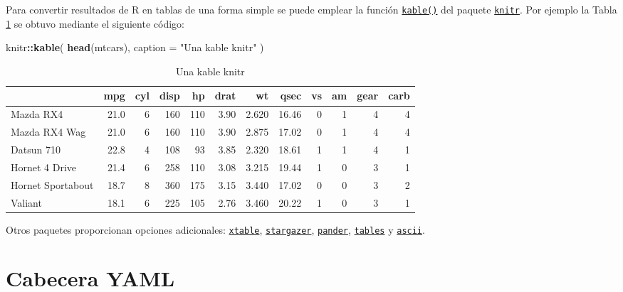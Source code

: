 \documentclass[
]{book}
\newenvironment{Shaded}{\begin{snugshade}}{\end{snugshade}}
\newcommand{\AttributeTok}[1]{\textcolor[rgb]{0.13,0.29,0.53}{#1}}
\newcommand{\FunctionTok}[1]{\textcolor[rgb]{0.13,0.29,0.53}{\textbf{#1}}}
\newcommand{\NormalTok}[1]{#1}
\newcommand{\SpecialCharTok}[1]{\textcolor[rgb]{0.81,0.36,0.00}{\textbf{#1}}}
\newcommand{\StringTok}[1]{\textcolor[rgb]{0.31,0.60,0.02}{#1}}
\theoremstyle{break}
\theoremstyle{nonumberplain}
\begin{document}
Para convertir resultados de R en tablas de una forma simple se puede emplear la función \href{https://rdrr.io/pkg/knitr/man/kable.html}{\texttt{kable()}} del paquete \href{https://yihui.org/knitr/}{\texttt{knitr}}. Por ejemplo la Tabla \ref{tab:kable} se obtuvo mediante el siguiente código:

\begin{Shaded}
\begin{Highlighting}[]
\NormalTok{knitr}\SpecialCharTok{::}\FunctionTok{kable}\NormalTok{(}
  \FunctionTok{head}\NormalTok{(mtcars), }
  \AttributeTok{caption =} \StringTok{"Una kable knitr"}
\NormalTok{)}
\end{Highlighting}
\end{Shaded}

\begin{table}

\caption{\label{tab:kable}Una kable knitr}
\centering
\begin{tabular}[t]{l|r|r|r|r|r|r|r|r|r|r|r}
\hline
  & mpg & cyl & disp & hp & drat & wt & qsec & vs & am & gear & carb\\
\hline
Mazda RX4 & 21.0 & 6 & 160 & 110 & 3.90 & 2.620 & 16.46 & 0 & 1 & 4 & 4\\
\hline
Mazda RX4 Wag & 21.0 & 6 & 160 & 110 & 3.90 & 2.875 & 17.02 & 0 & 1 & 4 & 4\\
\hline
Datsun 710 & 22.8 & 4 & 108 & 93 & 3.85 & 2.320 & 18.61 & 1 & 1 & 4 & 1\\
\hline
Hornet 4 Drive & 21.4 & 6 & 258 & 110 & 3.08 & 3.215 & 19.44 & 1 & 0 & 3 & 1\\
\hline
Hornet Sportabout & 18.7 & 8 & 360 & 175 & 3.15 & 3.440 & 17.02 & 0 & 0 & 3 & 2\\
\hline
Valiant & 18.1 & 6 & 225 & 105 & 2.76 & 3.460 & 20.22 & 1 & 0 & 3 & 1\\
\hline
\end{tabular}
\end{table}

Otros paquetes proporcionan opciones adicionales: \href{http://xtable.r-forge.r-project.org/}{\texttt{xtable}}, \href{https://CRAN.R-project.org/package=stargazer}{\texttt{stargazer}}, \href{https://rapporter.github.io/pander/}{\texttt{pander}}, \href{https://dmurdoch.github.io/tables/}{\texttt{tables}} y \href{https://github.com/mclements/ascii}{\texttt{ascii}}.

\section{Cabecera YAML}\label{yaml}
\end{document}
